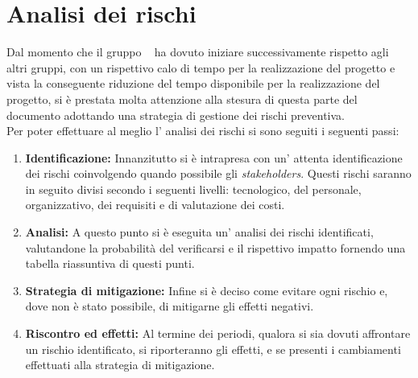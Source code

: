 \section{Analisi dei rischi}
Dal momento che il gruppo \gruppo~ ha dovuto iniziare successivamente rispetto agli altri gruppi, con un rispettivo calo di tempo per la realizzazione del progetto e vista la conseguente riduzione del tempo disponibile per la realizzazione del progetto, si è prestata molta attenzione alla stesura di questa parte del documento adottando una strategia di gestione dei rischi preventiva.\\
Per poter effettuare al meglio l' analisi dei rischi si sono seguiti i seguenti passi:
\begin{enumerate}
	\item \textbf{Identificazione: }Innanzitutto si è intrapresa con un' attenta identificazione dei rischi coinvolgendo quando possibile gli \textit{stakeholders}. Questi rischi saranno in seguito divisi secondo i seguenti livelli: tecnologico, del personale, organizzativo, dei requisiti e di valutazione dei costi.
\item \textbf{Analisi: }A questo punto si è eseguita un' analisi dei rischi identificati, valutandone la probabilità del verificarsi e il rispettivo impatto fornendo una tabella riassuntiva di questi punti.
\item \textbf{Strategia di mitigazione: }Infine si è deciso come evitare ogni rischio e, dove non è stato possibile, di mitigarne gli effetti negativi.
\item \textbf{Riscontro ed effetti:} Al termine dei periodi, qualora si sia dovuti affrontare un rischio identificato, si riporteranno gli effetti, e se presenti i cambiamenti effettuati alla strategia di mitigazione.
\end{enumerate}
